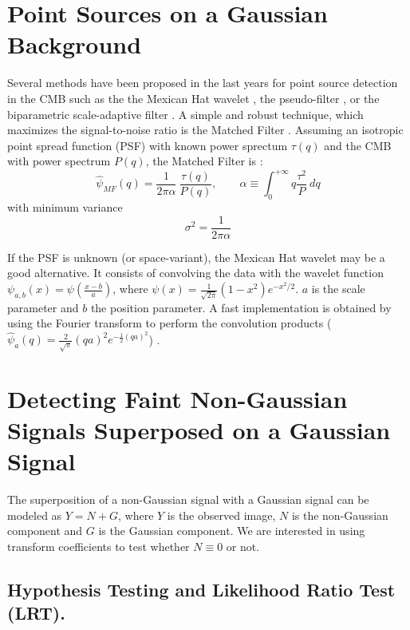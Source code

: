 \section{Point Sources on a Gaussian Background}

Several methods have been proposed in the last years for point source detection in the CMB such as the the Mexican Hat wavelet \citep{gauss:cayon00,gauss:cayon01}, 
the pseudo-filter \citep{gauss:sanz01}, or the biparametric scale-adaptive filter \citep{gauss:sanz05}. A simple and robust technique, which maximizes 
the signal-to-noise ratio is the Matched Filter \citep{gauss:vio02}. Assuming an isotropic point spread function (PSF) with known power sprectum $\tau(q)$ 
and the CMB with power spectrum $P(q)$, the Matched Filter is \citep{gauss:vio02}:
\begin{equation} 
\label{eqn_mf}
\widehat{\psi}_{MF}(q) = \frac{1}{2 \pi \alpha}~ \frac{\tau(q)}{P(q)},\qquad \alpha \equiv \int_0^{+\infty}q \frac{\tau^2}{P} ~dq
\end{equation}
with minimum variance
\begin{equation} 
\sigma^2 = \frac{1}{2 \pi \alpha}
\end{equation}

\newpage
If the PSF is unknown (or space-variant), the Mexican Hat wavelet may be a good alternative. It consists of convolving the data 
with the wavelet function $\psi_{a,b} (x) =  \psi(\frac{x-b}{a})$, where $\psi(x)= \frac{1}{\sqrt{2\pi}}(1 - x^2) e^{- x^2/2}$. 
$a$ is the scale parameter and $b$ the position parameter. A fast implementation is obtained by using the Fourier transform to 
perform the convolution products ($\widehat{\psi}_{a}(q) = \frac{2}{\sqrt{\pi}} {(q a )}^2 e^{- \frac{1}{2}{(q a)}^2}$) \citep{gauss:sanz05}.




\section{Detecting Faint Non-Gaussian Signals Superposed on a Gaussian Signal}
\label{sec:Theory}
The superposition of a non-Gaussian signal with a Gaussian signal can be modeled as $Y = N + G$, where $Y$ is the observed image, 
$N$ is the non-Gaussian component and $G$ is the Gaussian component. We are interested in using transform coefficients to test 
whether $N \equiv 0$ or not.  

\subsection{Hypothesis Testing and Likelihood Ratio Test (LRT).}  
\label{subsec:LRT}

